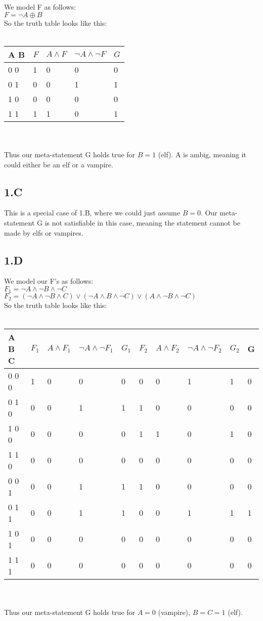 \documentclass[12pt]{article}
\begin{document}
We model F as follows:\\
$F = \neg A \oplus B$ \\
So the truth table looks like this:\\\\
\begin{tabular}{  l | l | l | l | l}
	A B & $F$ & $A \land F $ & $\neg A \land \neg F$ & $G$ \\ \hline
	0 0 & 1 & 0 & 0 & 0 \\
	0 1 & 0 & 0 & 1 & 1 \\
	1 0 & 0 & 0 & 0 & 0 \\
	1 1 & 1 & 1 & 0 & 1 \\
\end{tabular} \\\\
Thus our meta-statement G holds true for $B=1$ (elf). A is ambig, meaning it could either be an elf or a vampire.

\subsection*{1.C}

This is a special case of 1.B, where we could just assume $B=0$. Our meta-statement G is not satisfiable in this case, meaning the statement cannot be made by elfs or vampires.

\subsection*{1.D}
We model our F's as follows:\\
$F_1 = \neg A \land \neg B \land \neg C$\\	
$F_2 = (\neg A \land \neg B \land C) \lor (\neg A \land B \land \neg C) \lor (A \land \neg B \land \neg C)$ \\
So the truth table looks like this:\\\\
\begin{tabular}{  l | l | l | l | l | l | l | l | l | l}
	A B C & $F_1$ & $A \land F_1 $ & $\neg A \land \neg F_1$ & $G_1$ & $F_2$ & $A \land F_2 $ & $\neg A \land \neg F_2$ & $G_2$ & G\\ \hline
	0 0 0 & 1 & 0 & 0 & 0 & 0 & 0 & 1 & 1 & 0 \\
	0 1 0 & 0 & 0 & 1 & 1 & 1 & 0 & 0 & 0 & 0 \\
	1 0 0 & 0 & 0 & 0 & 0 & 1 & 1 & 0 & 1 & 0 \\
	1 1 0 & 0 & 0 & 0 & 0 & 0 & 0 & 0 & 0 & 0 \\
	0 0 1 & 0 & 0 & 1 & 1 & 1 & 0 & 0 & 0 & 0 \\
	0 1 1 & 0 & 0 & 1 & 1 & 0 & 0 & 1 & 1 & 1 \\
	1 0 1 & 0 & 0 & 0 & 0 & 0 & 0 & 0 & 0 & 0 \\
	1 1 1 & 0 & 0 & 0 & 0 & 0 & 0 & 0 & 0 & 0 \\
\end{tabular} \\\\
Thus our meta-statement G holds true for $A=0$ (vampire), $B=C=1$ (elf).
\end{document}
